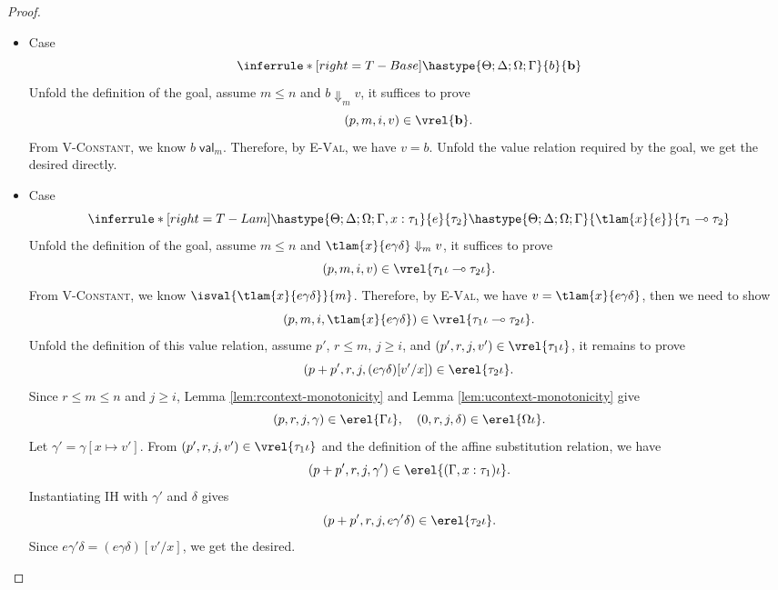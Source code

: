 \begin{proof}
\begin{itemize}
\item Case
\[
  \inferrule*[right=T-Base]
    { }
   {\hastype{\Theta;\Delta;\Omega;\Gamma}{b}{\textbf{b}}}
\]
Unfold the definition of the goal, assume $m\leq n$ and
$b\Downarrow_m v$, it suffices to prove
\[(p, m,i,v)\in\vrel{\textbf{b}}.\]
From \textsc{V-Constant}, we know $b \;\mathsf{val}_m$.
Therefore, by \textsc{E-Val}, we have $v=b$. 
Unfold the value relation required by the goal, we get the desired directly.

\item Case
\[
  \inferrule*[right=T-Lam]
        {\hastype{\Theta;\Delta;\Omega;\Gamma, x:\tau_1}{e}{\tau_2}}
        {\hastype{\Theta;\Delta;\Omega;\Gamma}{\tlam{x}{e}}{\tau_1 \multimap \tau_2}}
\]
Unfold the definition of the goal, assume $m\leq n$ and
$\tlam{x}{e\gamma\delta}\Downarrow_m v$, it suffices to prove
\[(p, m, i, v)\in\vrel{\tau_1\iota \multimap \tau_2\iota}.\]
From \textsc{V-Constant}, we know $\isval{\tlam{x}{e\gamma\delta}}{m}$.
Therefore, by \textsc{E-Val}, we have $v=\tlam{x}{e\gamma\delta}$, then we need to show
\[(p, m, i, \tlam{x}{e\gamma\delta})\in\vrel{\tau_1\iota \multimap \tau_2\iota}.\]
Unfold the definition of this value relation, assume $p'$, $r\leq m$, $j\geq i$, and
$(p', r, j, v')\in\vrel{\tau_1\iota}$, it remains to prove
\[(p+p', r, j, (e\gamma\delta)[v'/x])\in\erel{\tau_2\iota}.\]
Since $r\leq m\leq n$ and $j\geq i$, Lemma \ref{lem:rcontext-monotonicity} and Lemma \ref{lem:ucontext-monotonicity} give
\[(p, r, j, \gamma)\in\erel{\Gamma\iota}, \quad (0, r, j, \delta)\in\erel{\Omega\iota}.\]
Let $\gamma' = \gamma[x\mapsto v']$. From $(p', r, j, v')\in\vrel{\tau_1\iota}$ and the definition of the
affine substitution relation, we have
\[(p+p', r, j, \gamma')\in\erel{(\Gamma,x:\tau_1)\iota}.\]
Instantiating IH with $\gamma'$ and $\delta$ gives
\[(p+p', r, j, e\gamma'\delta)\in\erel{\tau_2\iota}.\]
Since $e\gamma'\delta = (e\gamma\delta)[v'/x]$, we get the desired.


\end{itemize}
\end{proof}
